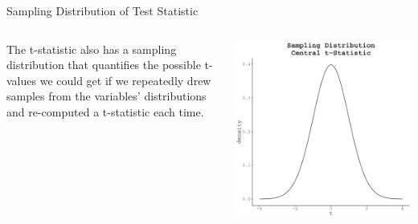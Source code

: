 \documentclass[10pt]{beamer}\usepackage[]{graphicx}\usepackage[]{color}
\makeatletter
\def\maxwidth{ %
  \ifdim\Gin@nat@width>\linewidth
    \linewidth
  \else
    \Gin@nat@width
  \fi
}
\newenvironment{knitrout}{}{} %
\makeatother
\begin{document}
\begin{frame}[shrink = 5]{Sampling Distribution of Test Statistic}

 \begin{columns}
   \begin{column}{0.5\textwidth}
     
     The t-statistic also has a sampling distribution that quantifies the
     possible t-values we could get if we repeatedly drew samples from the
     variables' distributions and re-computed a t-statistic each time.
     
   \end{column}
   \begin{column}{0.5\textwidth}
     
\begin{knitrout}\footnotesize
{}\color{fgcolor}

{\centering \includegraphics[width=\maxwidth]{figure/unnamed-chunk-12-1} 

}


\end{knitrout}

   \end{column}
 \end{columns}
 
\end{frame}
\watermarkon %
\end{document}
